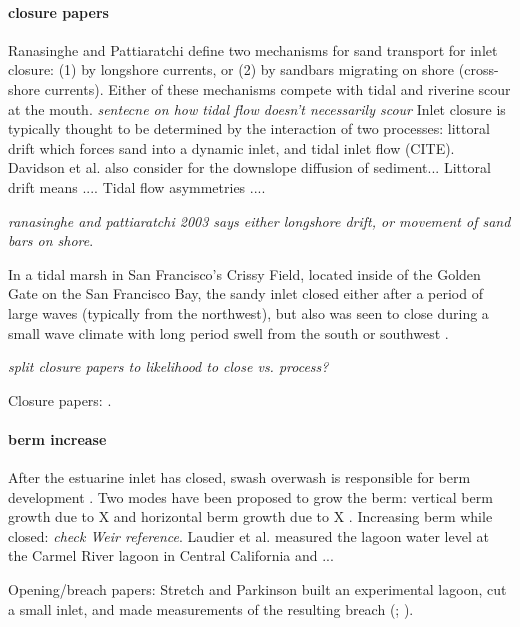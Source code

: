 \paragraph{closure papers} 
Ranasinghe and Pattiaratchi \parencite*{ranasinghe_seasonal_2003} define two mechanisms for sand transport for inlet closure: (1) by longshore currents, or (2) by sandbars migrating on shore (cross-shore currents). Either of these mechanisms compete with tidal and riverine scour at the mouth. \emph{sentecne on how tidal flow doesn't necessarily scour}
Inlet closure is typically thought to be determined by the interaction of two processes: littoral drift which forces sand into a dynamic inlet, and tidal inlet flow (CITE). Davidson et al. \parencite*{davidson_simple_2009} also consider for the downslope diffusion of sediment... Littoral drift means .... Tidal flow asymmetries .... 

\emph{ranasinghe and pattiaratchi 2003 says either longshore drift, or movement of sand bars on shore}.

In a tidal marsh in San Francisco's Crissy Field, located inside of the Golden Gate on the San Francisco Bay, the sandy inlet closed either after a period of large waves (typically from the northwest), but also was seen to close during a small wave climate with long period swell from the south or southwest \parencite{hanes_waves_2011}. 

\emph{split closure papers to likelihood to close vs. process?}

Closure papers: \parencite{ranasinghe_seasonal_2003, elwany_opening_1998, fortunato_morphological_2014, hanes_waves_2011, behrens_characterization_2009, behrens_episodic_2013}.

\paragraph{berm increase}
After the estuarine inlet has closed, swash overwash is responsible for berm development \parencite{baldock_morphodynamic_2008}. Two modes have been proposed to grow the berm: vertical berm growth due to X and horizontal berm growth due to X \parencite{weir_beach_2006}. 
Increasing berm while closed: \parencite{baldock_morphodynamic_2008, laudier_measured_2011, weir_beach_2006} \emph{check Weir reference}. 
Laudier et al. \parencite*{laudier_measured_2011} measured the lagoon water level at the Carmel River lagoon in Central California and ...

Opening/breach papers: \parencite{rich_hydrologic_2013, parkinson_breaching_2007, stretch_breaching_2006, elwany_opening_1998, fortunato_morphological_2014}
Stretch and Parkinson built an experimental lagoon, cut a small inlet, and made measurements of the resulting breach (\cite*{stretch_breaching_2006}; \cite{parkinson_breaching_2007}).



